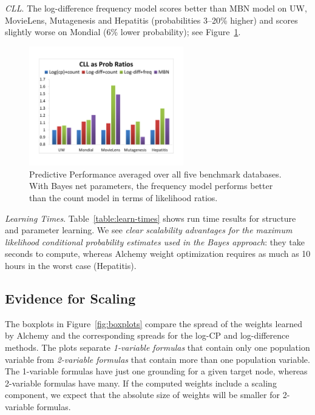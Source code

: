 \documentclass[twoside,11pt]{article}
\newcommand{\fixneeded}[1]{\textbf{[\footnotesize #1]}}
\newcommand{\point}[1]{\noindent\emph{#1}.}
\newcommand{\keypoint}[1]{{\em #1}}
\begin{document}
\point{CLL}
The log-difference frequency  model scores better than MBN model on UW, MovieLens, Mutagenesis and Hepatitis (probabilities 3--20\% higher) and scores slightly worse on Mondial (6\% lower probability); see Figure~\ref{fig:summarize}.

\begin{figure}[htbp]

\begin{center}
\includegraphics[width=0.6\textwidth]{CLL_Prob_Ratios_New}
\caption{Predictive Performance averaged over all five benchmark databases. With Bayes net parameters, the frequency model performs better than the count model in terms of likelihood ratios. 
}
\label{fig:summarize}
\end{center}
\end{figure}

\point{Learning Times}
Table~\ref{table:learn-times} shows run time results for structure and parameter learning. We see \keypoint{clear scalability advantages for the maximum likelihood conditional probability estimates used in the Bayes approach}: they take seconds to compute, whereas Alchemy weight optimization requires as much as 10 hours in the worst case (Hepatitis). 




\subsection{Evidence for Scaling} \label{sec:weights}
The boxplots in Figure~\ref{fig:boxplots} compare the spread of the weights learned by Alchemy and the corresponding spreads for the log-CP and log-difference methods.
The plots separate {\em 1-variable formulas} that contain only one population variable %
from {\em 2-variable formulas} that contain more than one population variable.
The 1-variable formulas have just one grounding for a given target node, whereas 2-variable formulas have many. If the computed weights include a scaling component, we expect that the absolute size of weights will be smaller for 2-variable formulas.
\end{document}
